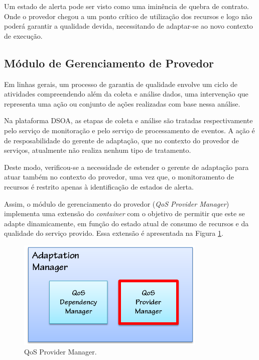 Um estado de alerta pode ser visto como uma iminência de quebra de contrato. Onde o provedor chegou a um ponto crítico de utilização dos recursos e logo não poderá garantir a qualidade devida, necessitando de adaptar-se ao novo contexto de execução.

\subsection{Módulo de Gerenciamento de Provedor}
\label{subsec:qos_provider}
Em linhas gerais, um processo de garantia de qualidade envolve um ciclo de atividades compreendendo além da coleta e análise dados, uma intervenção que representa uma ação ou conjunto de ações realizadas com base nessa análise. 

Na plataforma DSOA, as etapas de coleta e análise são tratadas respectivamente pelo serviço de monitoração e pelo serviço de processamento de eventos. A ação é de resposabilidade do gerente de adaptação, que no contexto do provedor de serviços, atualmente não realiza nenhum tipo de tratamento.

Deste modo, verificou-se a necessidade de estender o gerente de adaptação para atuar também no contexto do provedor, uma vez que, o monitoramento de recursos é restrito apenas à identificação de estados de alerta.

Assim, o módulo de gerenciamento do provedor (\textit{QoS Provider Manager}) implementa uma extensão do \textit{container} com o  objetivo de permitir que este se adapte dinamicamente, em função do estado atual de consumo de recursos e da qualidade do serviço provido. Essa extensão é apresentada na Figura \ref{fig:adapt_module}.


\begin{figure}[htp]
\centering
\includegraphics[width=9cm]{chapters/chapter4/adaptation-manager.png}
\caption[QoS Provider Manager]{QoS Provider Manager.}
\label{fig:adapt_module}
\end{figure}

